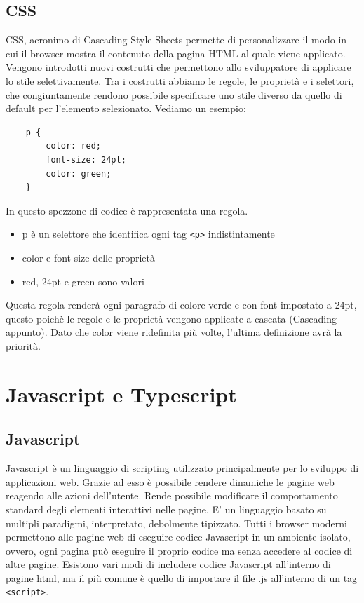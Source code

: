 \subsection{CSS}
CSS, acronimo di Cascading Style Sheets permette di personalizzare il modo in cui il browser mostra il contenuto della pagina HTML al quale viene applicato.
Vengono introdotti nuovi costrutti che permettono allo sviluppatore di applicare lo stile selettivamente.
Tra i costrutti abbiamo le regole, le proprietà e i selettori, che congiuntamente rendono possibile specificare uno stile diverso da quello di default per l'elemento selezionato. Vediamo un esempio:
\begin{verbatim}
    p {
        color: red;
        font-size: 24pt;
        color: green;
    }
\end{verbatim}
In questo spezzone di codice è rappresentata una regola.
\begin{itemize}
    \item p è un selettore che identifica ogni tag \lstinline{<p>} indistintamente
    \item color e font-size delle proprietà
    \item red, 24pt e green sono valori
\end{itemize}
Questa regola renderà ogni paragrafo di colore verde e con font impostato a 24pt, questo poichè le regole e le proprietà vengono applicate a cascata (Cascading appunto).
Dato che color viene ridefinita più volte, l'ultima definizione avrà la priorità.

\section{Javascript e Typescript}
\subsection{Javascript}
Javascript è un linguaggio di scripting utilizzato principalmente per lo sviluppo di applicazioni web.
Grazie ad esso è possibile rendere dinamiche le pagine web reagendo alle azioni dell'utente.
Rende possibile modificare il comportamento standard degli elementi interattivi nelle pagine.
E' un linguaggio basato su multipli paradigmi, interpretato, debolmente tipizzato.
Tutti i browser moderni permettono alle pagine web di eseguire codice Javascript in un ambiente isolato, ovvero, ogni pagina può eseguire il proprio codice ma senza accedere al codice di altre pagine.
Esistono vari modi di includere codice Javascript all'interno di pagine html, ma il più comune è quello di importare il file .js all'interno di un tag \lstinline{<script>}.
